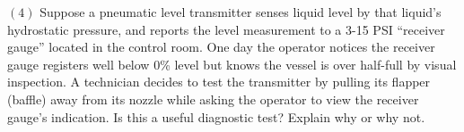 \vskip 20pt

\item{$(4)$} Suppose a pneumatic level transmitter senses liquid level by that liquid's hydrostatic pressure, and reports the level measurement to a 3-15 PSI ``receiver gauge'' located in the control room.  One day the operator notices the receiver gauge registers well below 0\% level but knows the vessel is over half-full by visual inspection.  A technician decides to test the transmitter by pulling its flapper (baffle) away from its nozzle while asking the operator to view the receiver gauge's indication.  Is this a useful diagnostic test?  Explain why or why not.








